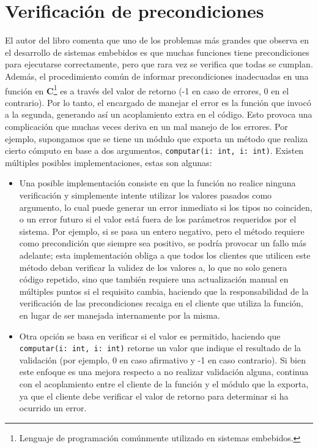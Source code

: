 \section{Verificación de precondiciones}
El autor del libro \cite{douglass} comenta que uno de los problemas más grandes que observa en el desarrollo de sistemas embebidos es que muchas funciones tiene precondiciones para ejecutarse correctamente, pero que rara vez se verifica que todas se cumplan. Además, el procedimiento común de informar precondiciones inadecuadas en una función en \textbf{C}\footnote{Lenguaje de programación comúnmente utilizado en sistemas embebidos.} es a través del valor de retorno (-1 en caso de errores, 0 en el contrario). Por lo tanto, el encargado de manejar el error es la función que invocó a la segunda, generando así un acoplamiento extra en el código. Esto provoca una complicación que muchas veces deriva en un mal manejo de los errores. Por ejemplo, supongamos que se tiene un módulo que exporta un método que realiza cierto cómputo en base a dos argumentos, \verb|computar(i: int, i: int)|. Existen múltiples posibles implementaciones, estas son algunas:
\begin{itemize}
    \item Una posible implementación consiste en que la función no realice ninguna verificación y simplemente intente utilizar los valores pasados como argumento, lo cual puede generar un error inmediato si los tipos no coinciden, o un error futuro si el valor está fuera de los parámetros requeridos por el sistema. Por ejemplo, si se pasa un entero negativo, pero el método requiere como precondición que siempre sea positivo, se podría provocar un fallo más adelante; esta implementación obliga a que todos los clientes que utilicen este método deban verificar la validez de los valores a, lo que no solo genera código repetido, sino que también requiere una actualización manual en múltiples puntos si el requisito cambia, haciendo que la responsabilidad de la verificación de las precondiciones recaiga en el cliente que utiliza la función, en lugar de ser manejada internamente por la misma.
    \item Otra opción se basa en verificar si el valor es permitido, haciendo que \verb|computar(i: int, i: int)| retorne un valor que indique el resultado de la validación (por ejemplo, 0 en caso afirmativo y -1 en caso contrario). Si bien este enfoque es una mejora respecto a no realizar validación alguna, continua con el acoplamiento entre el cliente de la función y el módulo que la exporta, ya que el cliente debe verificar el valor de retorno para determinar si ha ocurrido un error.
\end{itemize}

